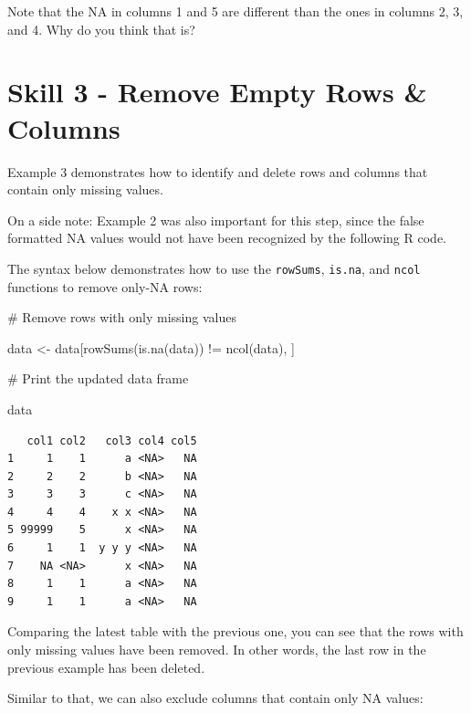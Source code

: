 \documentclass[
  letterpaper,
  DIV=11,
  numbers=noendperiod]{scrreprt}
\newenvironment{Shaded}{\begin{snugshade}}{\end{snugshade}}
\newcommand{\CommentTok}[1]{\textcolor[rgb]{0.37,0.37,0.37}{#1}}
\newcommand{\FunctionTok}[1]{\textcolor[rgb]{0.28,0.35,0.67}{#1}}
\newcommand{\NormalTok}[1]{\textcolor[rgb]{0.00,0.23,0.31}{#1}}
\newcommand{\OtherTok}[1]{\textcolor[rgb]{0.00,0.23,0.31}{#1}}
\newcommand{\SpecialCharTok}[1]{\textcolor[rgb]{0.37,0.37,0.37}{#1}}
\begin{document}
Note that the NA in columns 1 and 5 are different than the ones in
columns 2, 3, and 4. Why do you think that is?

\section*{Skill 3 - Remove Empty Rows \&
Columns}\label{skill-3---remove-empty-rows-columns}


Example 3 demonstrates how to identify and delete rows and columns that
contain only missing values.

On a side note: Example 2 was also important for this step, since the
false formatted NA values would not have been recognized by the
following R code.

The syntax below demonstrates how to use the \texttt{rowSums},
\texttt{is.na}, and \texttt{ncol} functions to remove only-NA rows:

\begin{Shaded}
\begin{Highlighting}[]
\CommentTok{\# Remove rows with only missing values}

\NormalTok{data }\OtherTok{\textless{}{-}}\NormalTok{ data[}\FunctionTok{rowSums}\NormalTok{(}\FunctionTok{is.na}\NormalTok{(data)) }\SpecialCharTok{!=} \FunctionTok{ncol}\NormalTok{(data), ]}

\CommentTok{\# Print the updated data frame}

\NormalTok{data}
\end{Highlighting}
\end{Shaded}

\begin{verbatim}
   col1 col2   col3 col4 col5
1     1    1      a <NA>   NA
2     2    2      b <NA>   NA
3     3    3      c <NA>   NA
4     4    4    x x <NA>   NA
5 99999    5      x <NA>   NA
6     1    1  y y y <NA>   NA
7    NA <NA>      x <NA>   NA
8     1    1      a <NA>   NA
9     1    1      a <NA>   NA
\end{verbatim}

Comparing the latest table with the previous one, you can see that the
rows with only missing values have been removed. In other words, the
last row in the previous example has been deleted.

Similar to that, we can also exclude columns that contain only NA
values:
\end{document}
